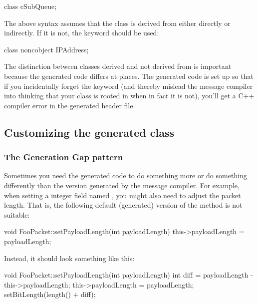 \begin{msg}
class cSubQueue;
\end{msg}

The above syntax assumes that the class is derived from 
either directly or indirectly. If it is not, the 
keyword should be used:

\begin{msg}
class noncobject IPAddress;
\end{msg}

The distinction between classes derived and not derived from 
is important because the generated code differs at places.
The generated code is set up so that if you incidentally
forget the  keyword (and thereby mislead the
message compiler into thinking that your class is rooted in
 when in fact it is not), you'll get a C++ compiler
error in the generated header file.


\subsection{Customizing the generated class}
\label{sec:ch-messages:customizing-generated-class}


\subsubsection{The Generation Gap pattern}

Sometimes you need the generated code to do something
more or do something differently than the version generated
by the message compiler.
For example, when setting a integer field named ,
you might also need to adjust the packet length. That is,
the following default (generated) version of the
 method is not suitable:

\begin{cpp}
void FooPacket::setPayloadLength(int payloadLength)
{
    this->payloadLength = payloadLength;
}
\end{cpp}

Instead, it should look something like this:

\begin{cpp}
void FooPacket::setPayloadLength(int payloadLength)
{
    int diff = payloadLength - this->payloadLength;
    this->payloadLength = payloadLength;
    setBitLength(length() + diff);
}
\end{cpp}

